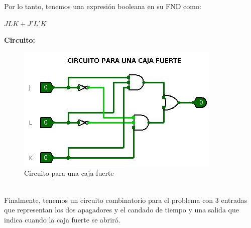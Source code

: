 \documentclass[12pt]{article} %
\begin{document}
\begin{enumerate}
            Por lo tanto, tenemos una expresión booleana en su FND como:
            \begin{center}
                $JLK + J'L'K$
            \end{center}

            \textbf{Circuito:} 
            \begin{figure}[h!]
                \centering 
                \includegraphics[scale=0.8]{ejercicio4.jpg}
                \caption{Circuito para una caja fuerte}
            \end{figure}
            \\
            Finalmente, tenemos un circuito combinatorio para el problema
            con 3 entradas que representan los dos apagadores y el candado
            de tiempo y una salida que indica cuando la caja fuerte se 
            abrirá.

    \end{enumerate}
\end{document}
